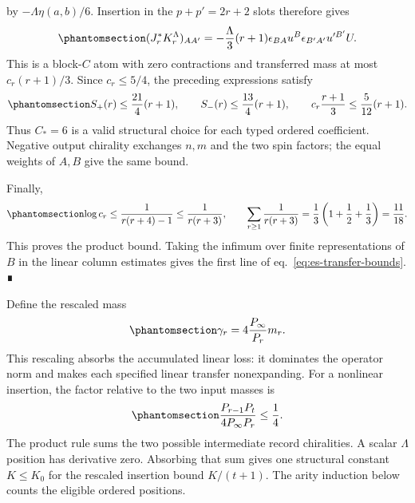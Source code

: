 \documentclass[
  english,
  11pt,
  reqno]{amsart}
\newcounter{none} %
\begin{document}
by \(-\Lambda\eta(a,b)/6\). Insertion in the \(p+p'=2r+2\) slots
therefore gives
\begin{equation}\protect\phantomsection\label{eq:es-source-scalar-polynomial}{
 (J_r^*K_r^{\Lambda})_{AA'}
 =-\frac{\Lambda}{3}(r+1)
     \epsilon_{BA}u^B\epsilon_{B'A'}u'^{B'}U.
}\end{equation} This is a block-\(C\) atom with zero contractions and
transferred mass at most \(c_r(r+1)/3\). Since \(c_r\le5/4\), the
preceding expressions satisfy
\begin{equation}\protect\phantomsection\label{eq:es-source-uniform-bound}{
 S_+(r)\le\frac{21}{4}(r+1),\qquad
 S_-(r)\le\frac{13}{4}(r+1),\qquad
 c_r\frac{r+1}{3}\le\frac5{12}(r+1).
}\end{equation} Thus \(C_*=6\) is a valid structural choice for each
typed ordered coefficient. Negative output chirality exchanges \(n,m\)
and the two spin factors; the equal weights of \(A,B\) give the same
bound.

Finally,
\begin{equation}\protect\phantomsection\label{eq:es-summable-transfer-cost}{
 \log c_r\le\frac1{r(r+4)-1}\le\frac1{r(r+3)},\qquad
 \sum_{r\ge1}\frac1{r(r+3)}=\frac13\left(1+\frac12+\frac13\right)=\frac{11}{18}.
}\end{equation} This proves the product bound. Taking the infimum over
finite representations of \(B\) in the linear column estimates gives the
first line of eq.~\ref{eq:es-transfer-bounds}. ∎

Define the rescaled mass
\begin{equation}\protect\phantomsection\label{eq:es-rescaled-mass}{
 \gamma_r=4\frac{P_\infty}{P_r}m_r.
}\end{equation} This rescaling absorbs the accumulated linear loss: it
dominates the operator norm and makes each specified linear transfer
nonexpanding. For a nonlinear insertion, the factor relative to the two
input masses is
\begin{equation}\protect\phantomsection\label{eq:es-insertion-rescaling}{
 \frac{P_{r-1}P_t}{4P_\infty P_r}\le\frac14.
}\end{equation} The product rule sums the two possible intermediate
record chiralities. A scalar \(\Lambda\) position has derivative zero.
Absorbing that sum gives one structural constant \(K\le K_0\) for the
rescaled insertion bound \(K/(t+1)\). The arity induction below counts
the eligible ordered positions.

\protect{}\label{sec:es-ordered-coefficients}
\end{document}

